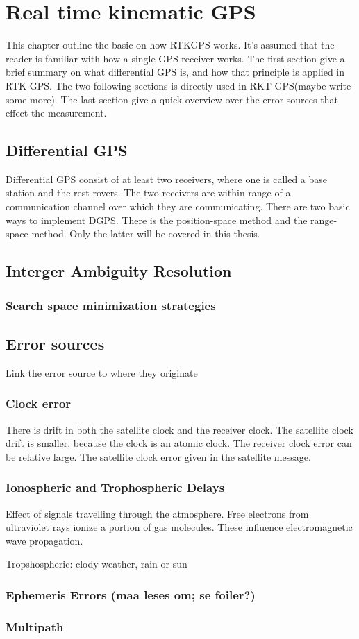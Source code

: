 
\chapter{Real time kinematic GPS}
This chapter outline the basic on how RTKGPS works. It's assumed that the reader is familiar with how a single GPS receiver works. The first section give a brief summary on what differential GPS is, and how that principle is applied in RTK-GPS. The two following sections is directly used in RKT-GPS(maybe write some more). The last section give a quick overview over the error sources that effect the measurement.
\section{Differential GPS}
Differential GPS consist of at least two receivers, where one is called a base station and the rest rovers. The two receivers are within range of a communication channel over which they are communicating. There are two basic ways to implement DGPS. There is the position-space method and the range-space method. Only the latter will be covered in this thesis.
\section{Interger Ambiguity Resolution}
\subsection{Search space minimization strategies}
\section{Error sources}
Link the error source to where they originate
\subsection{Clock error}
There is drift in both the satellite clock and the receiver clock. The satellite clock drift is smaller, because the clock is an atomic clock. The receiver clock error can be relative large. The satellite clock error given in the satellite message. 
\subsection{Ionospheric and Trophospheric Delays}
Effect of signals travelling through the atmosphere. Free electrons from ultraviolet rays ionize a portion of gas molecules. These influence electromagnetic wave propagation.

Tropshospheric: clody weather, rain or sun
\subsection{Ephemeris Errors (maa leses om; se foiler?)}
\subsection{Multipath}

\cleardoublepage